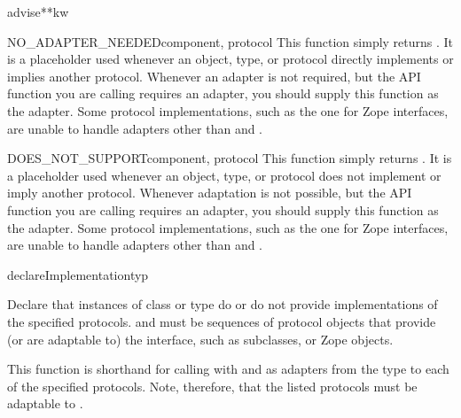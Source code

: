 \begin{verbatim%
}
\begin{verbatim%
}
\begin{verbatim%
}
\begin{verbatim%
}
\begin{funcdesc}{advise}{**kw}
\end{funcdesc}


\begin{funcdesc}{NO_ADAPTER_NEEDED}{component, protocol}
This function simply returns .  It is a placeholder used whenever
an object, type, or protocol directly implements or implies another protocol.
Whenever an adapter is not required, but the  API function
you are calling requires an adapter, you should supply this function as the
adapter.  Some protocol implementations, such as the one for Zope interfaces,
are unable to handle adapters other than  and
.
\end{funcdesc}


\begin{funcdesc}{DOES_NOT_SUPPORT}{component, protocol}
This function simply returns .  It is a placeholder used whenever
an object, type, or protocol does not implement or imply another protocol.
Whenever adaptation is not possible, but the  API function
you are calling requires an adapter, you should supply this function as the
adapter.  Some protocol implementations, such as the one for Zope interfaces,
are unable to handle adapters other than  and
.
\end{funcdesc}

\begin{funcdesc}{declareImplementation}{typ
 }

Declare that instances of class or type  do or do not provide
implementations of the specified protocols.   and
 must be sequences of protocol objects that
provide (or are adaptable to) the  interface,
such as  subclasses, or Zope 
objects.

This function is shorthand for calling 
with  and  as adapters
from the type to each of the specified protocols.  Note, therefore, that the
listed protocols must be adaptable to .
\end{funcdesc}



\end{verbatim%
}
\end{verbatim%
}
\end{verbatim%
}
\end{verbatim%
}

